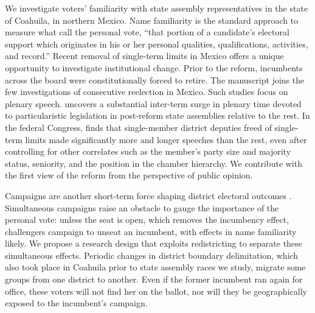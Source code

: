 \documentclass[letter,12pt]{article}
\begin{document}

We investigate voters' familiarity with state assembly representatives in the state of Coahuila, in northern Mexico. Name familiarity is the standard approach to measure what \citet[][:9]{cain.etal.1987} call the personal vote, ``that portion of a candidate's electoral support which originates in his or her personal qualities, qualifications, activities, and record.'' Recent removal of single-term limits in Mexico \citep[see][]{magarInstReel.2017} offers a unique opportunity to investigate institutional change. Prior to the reform, incumbents across the board were constitutionally forced to retire. The manuscript joins the few investigations of consecutive reelection in Mexico. Such studies focus on plenary speech. \citet{motolinia-reel-pork2021} uncovers a substantial inter-term surge in plenary time devoted to particularistic legislation in post-reform state assemblies relative to the rest. In the federal Congress, \citet{magar.debate.2021} finds that single-member district deputies freed of single-term limits made significantly more and longer speeches than the rest, even after controlling for other correlates such as the member's party size and majority status, seniority, and the position in the chamber hierarchy. We contribute with the first view of the reform from the perspective of public opinion.

Campaigns are another short-term force shaping district electoral outcomes \citep{downs.1957,jacobson.1990spending,popkin.1991}. Simultaneous campaigns raise an obstacle to gauge the importance of the personal vote: unless the seat is open, which removes the incumbency effect, challengers campaign to unseat an incumbent, with effects in name familiarity likely. We propose a research design that exploits redistricting to separate these simultaneous effects. Periodic changes in district boundary delimitation, which also took place in Coahuila prior to state assembly races we study, migrate some groups from one district to another. Even if the former incumbent ran again for office, these voters will not find her on the ballot, nor will they be geographically exposed to the incumbent's campaign.

\end{document}
